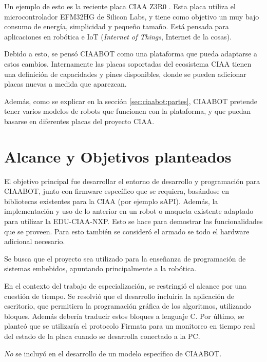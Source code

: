 Un ejemplo de esto es la reciente placa CIAA Z3R0 \citep{CIAA:z3r0}. Esta placa utiliza el microcontrolador EFM32HG de Silicon Labs, y tiene como objetivo un muy bajo consumo de energía, simplicidad y pequeño tamaño. Está pensada para aplicaciones en robótica e IoT (\emph{Internet of Things}, Internet de la cosas).

Debido a esto, se pensó CIAABOT como una plataforma que pueda adaptarse a estos cambios. Internamente las placas soportadas del ecosistema CIAA tienen una definición de capacidades y pines disponibles, donde se pueden adicionar placas nuevas a medida que aparezcan.

Además, como se explicar en la sección \ref{sec:ciaabot:partes}, CIAABOT pretende tener varios modelos de robots que funcionen con la plataforma, y que puedan basarse en diferentes placas del proyecto CIAA.

\section{Alcance y Objetivos planteados}
\label{sec:alcance}
El objetivo principal fue desarrollar el entorno de desarrollo y programación para CIAABOT, junto con firmware específico que se requiera, basándose en bibliotecas existentes para la CIAA (por ejemplo sAPI). Además, la implementación y uso de lo anterior en un robot o maqueta existente adaptado para utilizar la EDU-CIAA-NXP. Esto se hace para demostrar las funcionalidades que se proveen. Para esto también se consideró el armado se todo el hardware adicional necesario.

Se busca que el proyecto sea utilizado para la enseñanza de programación de sistemas embebidos, apuntando principalmente a la robótica.

En el contexto del trabajo de especialización, se restringió el alcance por una cuestión de tiempo. Se resolvió que el desarrollo incluiría la aplicación de escritorio, que permitiera la programación gráfica de los algoritmos, utilizando bloques. Además debería traducir estos bloques a lenguaje C. Por último, se planteó que se utilizaría el protocolo Firmata para un monitoreo en tiempo real del estado de la placa cuando se desarrolla conectado a la PC.

\emph{No} se incluyó en el desarrollo de un modelo específico de CIAABOT.
